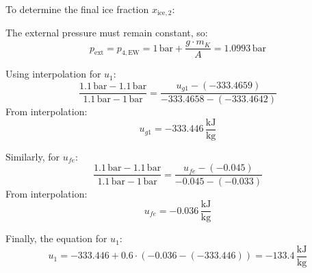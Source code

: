 To determine the final ice fraction \( x_{\text{ice},2} \):  

The external pressure must remain constant, so:  
\[
p_{\text{ext}} = p_{4,\text{EW}} = 1 \, \text{bar} + \frac{g \cdot m_K}{A} = 1.0993 \, \text{bar}
\]  

Using interpolation for \( u_1 \):  
\[
\frac{1.1 \, \text{bar} - 1.1 \, \text{bar}}{1.1 \, \text{bar} - 1 \, \text{bar}} = \frac{u_{g1} - (-333.4659)}{-333.4658 - (-333.4642)}
\]  
From interpolation:  
\[
u_{g1} = -333.446 \, \frac{\text{kJ}}{\text{kg}}
\]  

Similarly, for \( u_{fe} \):  
\[
\frac{1.1 \, \text{bar} - 1.1 \, \text{bar}}{1.1 \, \text{bar} - 1 \, \text{bar}} = \frac{u_{fe} - (-0.045)}{-0.045 - (-0.033)}
\]  
From interpolation:  
\[
u_{fe} = -0.036 \, \frac{\text{kJ}}{\text{kg}}
\]  

Finally, the equation for \( u_1 \):  
\[
u_1 = -333.446 + 0.6 \cdot (-0.036 - (-333.446)) = -133.4 \, \frac{\text{kJ}}{\text{kg}}
\]